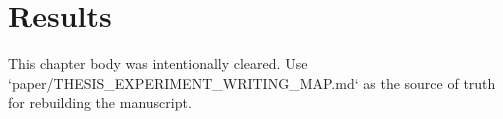 \chapter{Results}
\label{ch:results}

This chapter body was intentionally cleared. Use `paper/THESIS_EXPERIMENT_WRITING_MAP.md` as the source of truth for rebuilding the manuscript.

